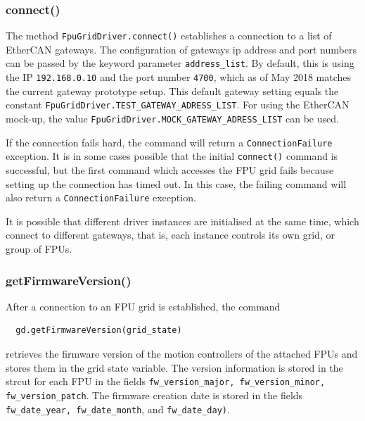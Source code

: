 \documentclass[11pt,a4paper]{scrartcl}
\begin{document}
\subsubsection{connect()}
\label{sec:connect}
     The method
\texttt{FpuGridDriver.connect()} establishes a connection to a list of
EtherCAN gateways. The configuration of gateways ip address and port
numbers can be passed by the keyword parameter
\texttt{address\_list}. By default, this is using the IP
\texttt{192.168.0.10} and the port number \texttt{4700}, which as of
May 2018 matches the current gateway prototype setup. This default
gateway setting equals the constant
\texttt{FpuGridDriver.TEST\_GATEWAY\_ADRESS\_LIST}.  For using the
EtherCAN mock-up, the value
\texttt{FpuGridDriver.MOCK\_GATEWAY\_ADRESS\_LIST} can be used.

If the connection fails hard, the command will return a
\texttt{ConnectionFailure} exception.  It is in some cases possible
that the initial \texttt{connect()} command is successful, but the
first command which accesses the FPU grid fails because setting up the
connection has timed out. In this case, the failing command will
also return a \texttt{ConnectionFailure} exception.

It is possible that different driver instances are initialised at the
same time, which connect to different gateways, that is, each instance
controls its own grid, or group of FPUs.

\subsubsection{getFirmwareVersion()}
\label{sec:getfirmwareversion}

After a connection to an FPU grid is established, the command
\begin{verbatim}
  gd.getFirmwareVersion(grid_state)
\end{verbatim}
retrieves the firmware version of the motion controllers of the
attached FPUs and stores them in the grid state variable. The version
information is stored in the strcut for each FPU in the fields
\texttt{fw\_version\_major, fw\_version\_minor, fw\_version\_patch}.
The firmware creation date is stored in the fields
\texttt{fw\_date\_year, fw\_date\_month}, and \texttt{fw\_date\_day)}.
\end{document}
